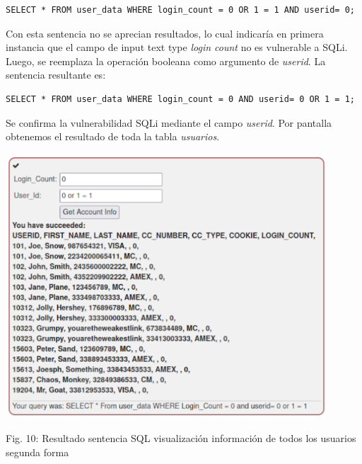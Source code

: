 \documentclass[12pt,oneside,a4paper]{book}
\begin{document}
\begin{enumerate}
\begin{enumerate}
        \vspace{1em}
        
        \begin{verbatim}
SELECT * FROM user_data WHERE login_count = 0 OR 1 = 1 AND userid= 0;
        \end{verbatim}

        Con esta sentencia no se aprecian resultados, lo cual indicaría en primera instancia que el campo de input text type \textit{login count} no es vulnerable a SQLi. Luego, se reemplaza la operación booleana como argumento de \textit{userid}. La sentencia resultante es:

        \vspace{1em}
        
        \begin{verbatim}
SELECT * FROM user_data WHERE login_count = 0 AND userid= 0 OR 1 = 1;
        \end{verbatim}

        Se confirma la vulnerabilidad SQLi mediante el campo \textit{userid}. Por pantalla obtenemos el resultado de toda la tabla \textit{usuarios}.

        \newpage
        
        \begin{center}
            \includegraphics[width=12cm]{img/sqli7.png}
            
            \vspace{0.1em}
            
            Fig. 10: Resultado sentencia SQL visualización información de todos los usuarios segunda forma
        \end{center}
        

\end{enumerate}
\end{enumerate}
\end{document}
